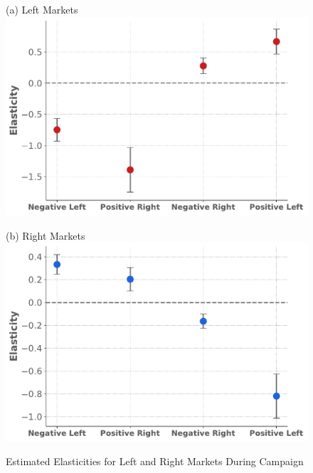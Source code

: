 \documentclass[12pt]{article}
\begin{document}
\begin{figure}[!htbp]
	\centering
	\caption{Estimated Elasticities for Left and Right Markets During Campaign}
	\label{fig:elasticities_campaign}
	\vspace{0.5em} %
	
	\begin{minipage}{0.45\textwidth}
		\centering
		(a) Left Markets\\
		\includegraphics[width=\linewidth]{figures/elasticities_left_campaign}
	\end{minipage}
	\hfill
	\begin{minipage}{0.45\textwidth}
		\centering
		\vspace{1.5em}
		(b) Right Markets \\
		\includegraphics[width=\linewidth]{figures/elasticities_right_campaign}
		\label{fig:2figsA}
	\end{minipage}
	

\end{figure}
\end{document}
